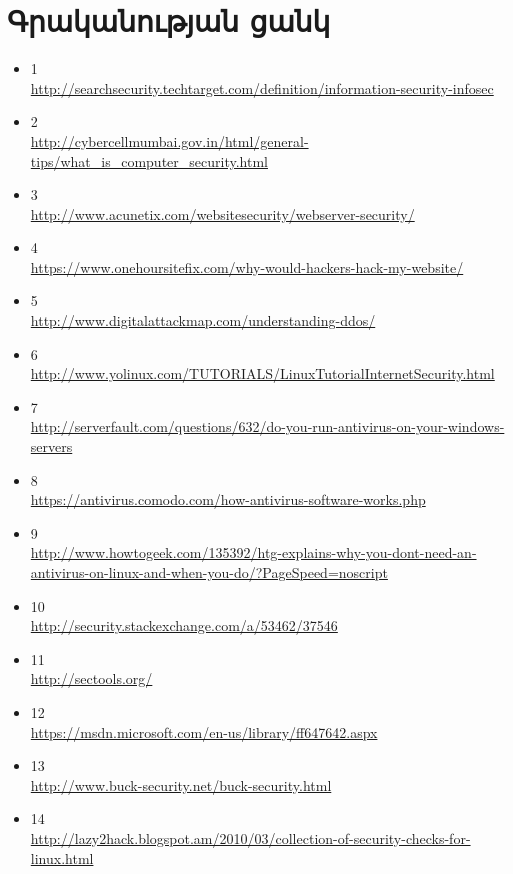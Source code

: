 \documentclass[a4paper,12pt]{article}
\begin{document}
\begin{sloppypar}
\section*{Գրականության ցանկ}
\begin{itemize}
\item 1 \\ 
	\url{http://searchsecurity.techtarget.com/definition/information-security-infosec}
\item 2 \\ 
	\url{http://cybercellmumbai.gov.in/html/general-tips/what\_is\_computer\_security.html}
\item 3 \\ 
	\url{http://www.acunetix.com/websitesecurity/webserver-security/}
\item 4 \\ 
	\url{https://www.onehoursitefix.com/why-would-hackers-hack-my-website/}
\item 5 \\ 
	\url{http://www.digitalattackmap.com/understanding-ddos/}
\item 6 \\ 
	\url{http://www.yolinux.com/TUTORIALS/LinuxTutorialInternetSecurity.html}
\item 7 \\ 
	\url{http://serverfault.com/questions/632/do-you-run-antivirus-on-your-windows-servers}
\item 8 \\ 
	\url{https://antivirus.comodo.com/how-antivirus-software-works.php}
\item 9 \\ 
	\url{http://www.howtogeek.com/135392/htg-explains-why-you-dont-need-an-antivirus-on-linux-and-when-you-do/?PageSpeed=noscript}
\item 10 \\ 
	\url{http://security.stackexchange.com/a/53462/37546}
\item 11 \\ 
	\url{http://sectools.org/}
\item 12 \\ 
	\url{https://msdn.microsoft.com/en-us/library/ff647642.aspx}
\item 13 \\ 
	\url{http://www.buck-security.net/buck-security.html}
\item 14 \\ 
	\url{http://lazy2hack.blogspot.am/2010/03/collection-of-security-checks-for-linux.html}

\end{itemize}
\end{sloppypar}
\end{document}
